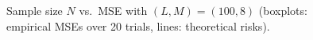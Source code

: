\documentclass[letterpaper]{article} %
\theoremstyle{plain}
\begin{document}
\begin{figure}[t]
    \centering
    \caption{Sample size $N$ vs.\ MSE with $(L, M) = (100, 8)$ (boxplots: empirical MSEs over 20 trials, lines: theoretical risks).}
    \label{fig:MSE-vs-N}
\end{figure}


\end{document}
